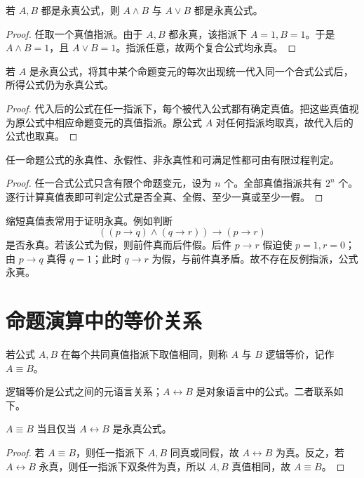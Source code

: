 \begin{theorem}[永真公式的合取与析取]\label{ch1-taut-combine}
若 $A,B$ 都是永真公式，则 $A\land B$ 与 $A\lor B$ 都是永真公式。
\end{theorem}
\begin{proof}
任取一个真值指派。由于 $A,B$ 都永真，该指派下 $A=1,B=1$。于是 $A\land B=1$，且 $A\lor B=1$。指派任意，故两个复合公式均永真。
\end{proof}

\begin{theorem}[永真式的统一代入]\label{ch1-substitution-taut}
若 $A$ 是永真公式，将其中某个命题变元的每次出现统一代入同一个合式公式后，所得公式仍为永真公式。
\end{theorem}
\begin{proof}
代入后的公式在任一指派下，每个被代入公式都有确定真值。把这些真值视为原公式中相应命题变元的真值指派。原公式 $A$ 对任何指派均取真，故代入后的公式也取真。
\end{proof}

\begin{theorem}[命题公式的有限可判定性]\label{ch1-decidability}
任一命题公式的永真性、永假性、非永真性和可满足性都可由有限过程判定。
\end{theorem}
\begin{proof}
任一合式公式只含有限个命题变元，设为 $n$ 个。全部真值指派共有 $2^n$ 个。逐行计算真值表即可判定公式是否全真、全假、至少一真或至少一假。
\end{proof}

缩短真值表常用于证明永真。例如判断
\[
  ((p\to q)\land(q\to r))\to(p\to r)
\]
是否永真。若该公式为假，则前件真而后件假。后件 $p\to r$ 假迫使 $p=1,r=0$；由 $p\to q$ 真得 $q=1$；此时 $q\to r$ 为假，与前件真矛盾。故不存在反例指派，公式永真。

\section{命题演算中的等价关系}

\begin{definition}[逻辑等价]\label{ch1-equivalence}
若公式 $A,B$ 在每个共同真值指派下取值相同，则称 $A$ 与 $B$ 逻辑等价，记作 $A\equiv B$。
\end{definition}

逻辑等价是公式之间的元语言关系；$A\leftrightarrow B$ 是对象语言中的公式。二者联系如下。

\begin{theorem}[等价判据]\label{ch1-equiv-iff}
$A\equiv B$ 当且仅当 $A\leftrightarrow B$ 是永真公式。
\end{theorem}
\begin{proof}
若 $A\equiv B$，则任一指派下 $A,B$ 同真或同假，故 $A\leftrightarrow B$ 为真。反之，若 $A\leftrightarrow B$ 永真，则任一指派下双条件为真，所以 $A,B$ 真值相同，故 $A\equiv B$。
\end{proof}

